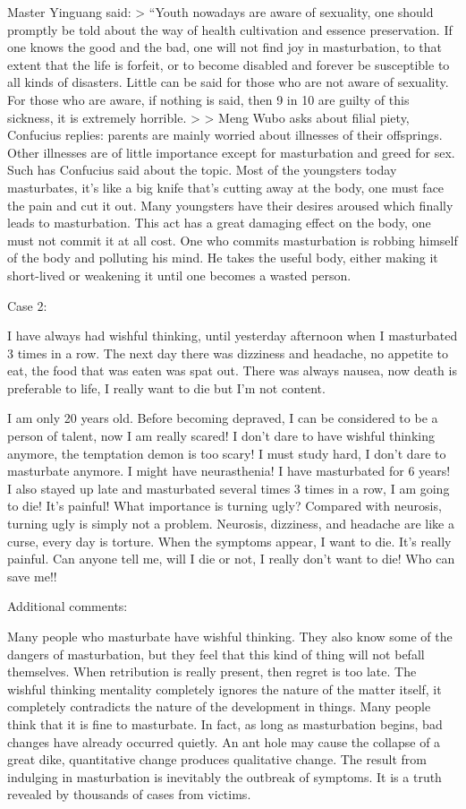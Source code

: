 \documentclass[
]{book}
\begin{document}
Master Yinguang said:
\textgreater{} ``Youth nowadays are aware of sexuality, one should promptly be told about the way of health cultivation and essence preservation. If one knows the good and the bad, one will not find joy in masturbation, to that extent that the life is forfeit, or to become disabled and forever be susceptible to all kinds of disasters. Little can be said for those who are not aware of sexuality. For those who are aware, if nothing is said, then 9 in 10 are guilty of this sickness, it is extremely horrible. \textgreater{} \textgreater{} Meng Wubo asks about filial piety, Confucius replies: parents are mainly worried about illnesses of their offsprings. Other illnesses are of little importance except for masturbation and greed for sex. Such has Confucius said about the topic. Most of the youngsters today masturbates, it's like a big knife that's cutting away at the body, one must face the pain and cut it out. Many youngsters have their desires aroused which finally leads to masturbation. This act has a great damaging effect on the body, one must not commit it at all cost. One who commits masturbation is robbing himself of the body and polluting his mind. He takes the useful body, either making it short-lived or weakening it until one becomes a wasted person.

Case 2:

I have always had wishful thinking, until yesterday afternoon when I masturbated 3 times in a row. The next day there was dizziness and headache, no appetite to eat, the food that was eaten was spat out. There was always nausea, now death is preferable to life, I really want to die but I'm not content.

I am only 20 years old. Before becoming depraved, I can be considered to be a person of talent, now I am really scared! I don't dare to have wishful thinking anymore, the temptation demon is too scary! I must study hard, I don't dare to masturbate anymore. I might have neurasthenia! I have masturbated for 6 years! I also stayed up late and masturbated several times 3 times in a row, I am going to die! It's painful! What importance is turning ugly? Compared with neurosis, turning ugly is simply not a problem. Neurosis, dizziness, and headache are like a curse, every day is torture. When the symptoms appear, I want to die. It's really painful. Can anyone tell me, will I die or not, I really don't want to die! Who can save me!!

Additional comments:

Many people who masturbate have wishful thinking. They also know some of the dangers of masturbation, but they feel that this kind of thing will not befall themselves. When retribution is really present, then regret is too late. The wishful thinking mentality completely ignores the nature of the matter itself, it completely contradicts the nature of the development in things. Many people think that it is fine to masturbate. In fact, as long as masturbation begins, bad changes have already occurred quietly. An ant hole may cause the collapse of a great dike, quantitative change produces qualitative change. The result from indulging in masturbation is inevitably the outbreak of symptoms. It is a truth revealed by thousands of cases from victims.
\end{document}
